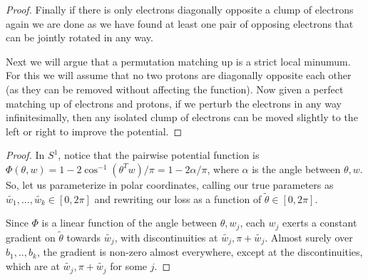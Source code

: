 \begin{proof}
Finally if there is only electrons diagonally opposite a clump of electrons again we are done as we have found at least one pair of opposing electrons that can be jointly rotated in any way.

Next we will argue that a permutation matching up is a strict local minumum. For this we will assume that no two protons are diagonally opposite each other (as they can be removed without affecting the function). Now given a perfect matching up of electrons and protons, if we perturb the electrons in any way infinitesimally, then any isolated clump of electrons can be moved slightly to  the left or right to improve the potential.
\end{proof}

\signconv*

\begin{proof}
In $S^1$, notice that the pairwise potential function is $\Phi(\theta,w) = 1 - 2\cos^{-1}(\theta^Tw)/\pi = 1 - 2\alpha/\pi$, where $\alpha$ is the angle between $\theta, w$. So, let us parameterize in polar coordinates, calling our true parameters as $\widetilde{w_1},...,\widetilde{w_k} \in [0,2\pi]$ and rewriting our loss as a function of $\widetilde{\theta} \in [0,2\pi]$. 

Since $\Phi$ is a linear function of the angle between $\theta, w_j$, each $w_j$ exerts a constant gradient on $\widetilde{\theta}$ towards $\widetilde{w_j}$, with discontinuities at $\widetilde{w_j},\pi+\widetilde{w_j}$. Almost surely over $b_1,..,b_k$, the gradient is non-zero almost everywhere, except at the discontinuities, which are at $\widetilde{w_j}, \pi+\widetilde{w_j}$ for some $j$. 
\end{proof}
